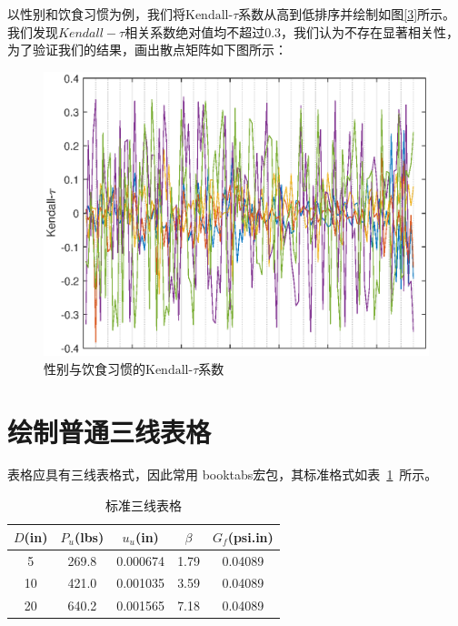 \documentclass{cumcmthesis}
\begin{document}
以性别和饮食习惯为例，我们将$\text{Kendall-}\tau$系数从高到低排序并绘制如图\ref{3}所示。我们发现${Kendall-}\tau$相关系数绝对值均不超过0.3，我们认为不存在显著相关性，为了验证我们的结果，画出散点矩阵如下图所示：
\begin{figure}[h]
\centering
\includegraphics{figures/A2.eps}
\caption{性别与饮食习惯的$\text{Kendall-}\tau$系数}\label{zd}
\end{figure}

















\section{绘制普通三线表格}
表格应具有三线表格式，因此常用 booktabs宏包，其标准格式如表~\ref{tab001}~所示。
\begin{table}[!htbp]
\caption{标准三线表格}\label{tab001} \centering
\begin{tabular}{ccccc}
\toprule[1.5pt]
$D$(in) & $P_u$(lbs) & $u_u$(in) & $\beta$ & $G_f$(psi.in)\\
\midrule[1pt]
 5 & 269.8 & 0.000674 & 1.79 & 0.04089\\
10 & 421.0 & 0.001035 & 3.59 & 0.04089\\
20 & 640.2 & 0.001565 & 7.18 & 0.04089\\
\bottomrule[1.5pt]
\end{tabular}
\end{table}
\end{document}
